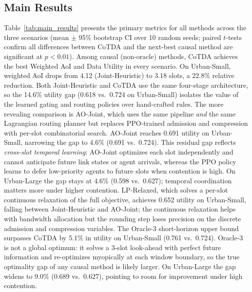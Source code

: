 \documentclass[final,3p,times,review,sort&compress]{elsarticle}
\begin{document}
\subsection{Main Results}
\label{subsec:main_results}

Table~\ref{tab:main_results} presents the primary metrics for all methods across the three scenarios (mean $\pm$ 95\% bootstrap CI over 10 random seeds; paired $t$-tests confirm all differences between CoTDA and the next-best causal method are significant at $p<0.01$). Among causal (non-oracle) methods, CoTDA achieves the best Weighted AoI and Data Utility in every scenario. On Urban-Small, weighted AoI drops from 4.12 (Joint-Heuristic) to 3.18 slots, a 22.8\% relative reduction. Both Joint-Heuristic and CoTDA use the same four-stage architecture, so the 14.6\% utility gap (0.618 vs.\ 0.724 on Urban-Small) isolates the value of the learned gating and routing policies over hand-crafted rules. The more revealing comparison is AO-Joint, which uses the same pipeline \emph{and} the same Lagrangian routing planner but replaces PPO-trained admission and compression with per-slot combinatorial search. AO-Joint reaches 0.691 utility on Urban-Small, narrowing the gap to 4.6\% (0.691 vs.\ 0.724). This residual gap reflects \emph{cross-slot temporal learning}: AO-Joint optimizes each slot independently and cannot anticipate future link states or agent arrivals, whereas the PPO policy learns to defer low-priority agents to future slots when contention is high. On Urban-Large the gap stays at 4.6\% (0.598 vs.\ 0.627); temporal coordination matters more under higher contention. LP-Relaxed, which solves a per-slot continuous relaxation of the full objective, achieves 0.652 utility on Urban-Small, falling between Joint-Heuristic and AO-Joint; the continuous relaxation helps with bandwidth allocation but the rounding step loses precision on the discrete admission and compression variables. The Oracle-3 short-horizon upper bound surpasses CoTDA by 5.1\% in utility on Urban-Small (0.761 vs.\ 0.724). Oracle-3 is not a global optimum: it solves a 3-slot look-ahead with perfect future information and re-optimizes myopically at each window boundary, so the true optimality gap of any causal method is likely larger. On Urban-Large the gap widens to 9.0\% (0.689 vs.\ 0.627), pointing to room for improvement under high contention.
\end{document}
